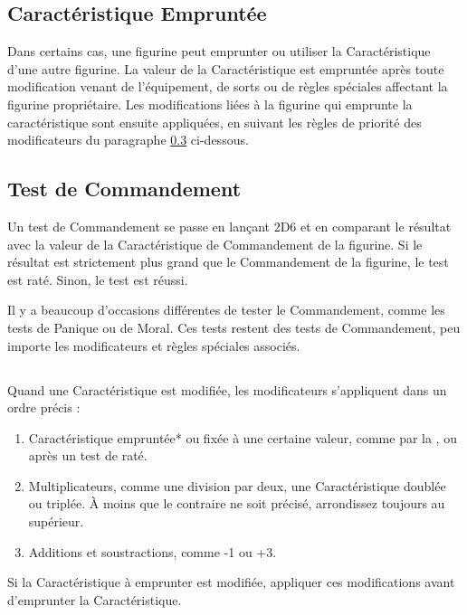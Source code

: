 \subsection{Caractéristique Empruntée}
\label{borrowed_characteristics}

Dans certains cas,  une figurine peut emprunter ou utiliser la Caractéristique d'une autre figurine. La valeur de la Caractéristique est empruntée après toute modification venant de l'équipement, de sorts ou de règles spéciales affectant la figurine propriétaire. Les modifications liées à la figurine qui emprunte la caractéristique sont ensuite appliquées, en suivant les règles de priorité des modificateurs du paragraphe \ref{priority_of_modifiers} ci-dessous.

\subsection{Test de Commandement}

Un test de Commandement se passe en lançant 2D6 et en comparant le résultat avec la valeur de la Caractéristique de Commandement de la figurine. Si le résultat est strictement plus grand que le Commandement de la figurine, le test est raté. Sinon, le test est réussi. 

Il y a beaucoup d'occasions différentes de tester le Commandement, comme les tests de Panique ou de Moral. Ces tests restent des tests de Commandement, peu importe les modificateurs et règles spéciales associés.

\newpage
\subsection[Priorité des modificateurs]{}
\label{priority_of_modifiers}

Quand une Caractéristique est modifiée, les modificateurs s'appliquent dans un ordre précis :
\begin{enumerate}
\item Caractéristique empruntée* ou fixée à une certaine valeur, comme par la \inspiringpresence{}, ou après un test de \fear{} raté.
\item Multiplicateurs, comme une division par deux, une Caractéristique doublée ou triplée. À moins que le contraire ne soit précisé, arrondissez toujours au supérieur.
\item Additions et soustractions, comme -1 ou +3.
\end{enumerate}
\noindent * Si la Caractéristique à emprunter est modifiée, appliquer ces modifications avant d'emprunter la Caractéristique. 

